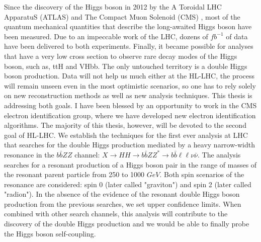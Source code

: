Since the discovery of the Higgs boson in 2012 by the A Toroidal LHC ApparatuS (ATLAS) and 	The Compact Muon Solenoid (CMS)%
, most of the quantum mechanical quantities that describe the long-awaited Higgs boson have been measured. Due to an impeccable work of the LHC, dozens of $fb^{-1}$ of data have been delivered to both experiments. Finally, it became possible for analyses that have a very low cross section to observe rare decay modes of the Higgs boson, such as, ttH and VHbb. The only untouched territory is a double Higgs boson production. Data will not help us much either at the HL-LHC, the process will remain unseen even in the most optimistic scenarios, so one has to rely solely on new reconstruction methods as well as new analysis techniques. This thesis is addressing both goals. I have been blessed by an opportunity to work in the CMS electron identification group, where we have developed new electron identification algorithms. The majority of this thesis, however, will be devoted to the second goal of HL-LHC. We establish the techniques for the first ever analysis at LHC that searches for the double Higgs production mediated by a heavy narrow-width resonance in the $b\bar{b}ZZ$ channel:  $X \to HH \to b\bar{b}ZZ^{*} \to b\bar{b} \ell\ell\nu \bar{\nu}$. The analysis searches for a resonant production of a Higgs boson pair in the range of masses of the resonant parent particle from 250 to 1000 $GeV$. Both spin scenarios of the resonance are considered: spin 0 (later called "graviton") and spin 2 (later called "radion"). In the absence of the evidence of the resonant double Higgs boson production from the previous searches, we set upper confidence limits. When combined with other search channels, this analysis will contribute to the discovery of the double Higgs production and we would be able to finally probe the Higgs boson self-coupling. 